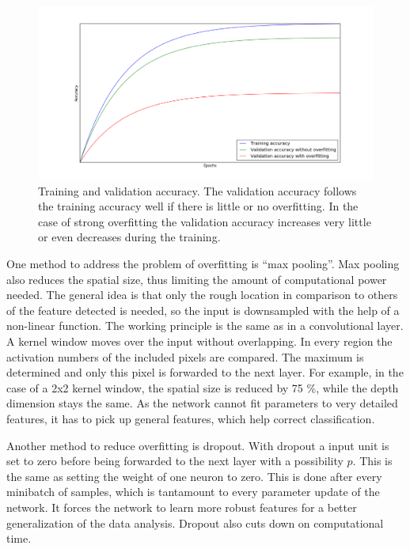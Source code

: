 \begin{figure}
\centering
\includegraphics[scale=0.35]{overfittingacc.png}
\caption{Training and validation accuracy. The validation accuracy follows the training accuracy well if there is little or no overfitting. In the case of strong overfitting the validation accuracy increases very little or even decreases during the training.}
\label{accuracy}
\end{figure}
One method to address the problem of overfitting is \enquote{max pooling}. Max pooling also reduces the spatial size, thus limiting the amount of computational power needed. The general idea is that only the rough location in comparison to others of the feature detected is needed, so the input is downsampled with the help of a non-linear function. The working principle is the same as in a convolutional layer. A kernel window moves over the input without overlapping. In every region the activation numbers of the included pixels are compared. The maximum is determined and only this pixel is forwarded to the next layer. For example, in the case of a 2x2 kernel window, the spatial size is reduced by 75 \%, while the depth dimension stays the same. As the network cannot fit parameters to very detailed features, it has to pick up general features, which help correct classification. 

Another method to reduce overfitting is dropout. With dropout a input unit is set to zero before being forwarded to the next layer with a possibility $p$. This is the same as setting the weight of one neuron to zero. This is done after every minibatch of samples, which is tantamount to every parameter update of the network. It forces the network to learn more robust features for a better generalization of the data analysis. Dropout also cuts down on computational time. 

